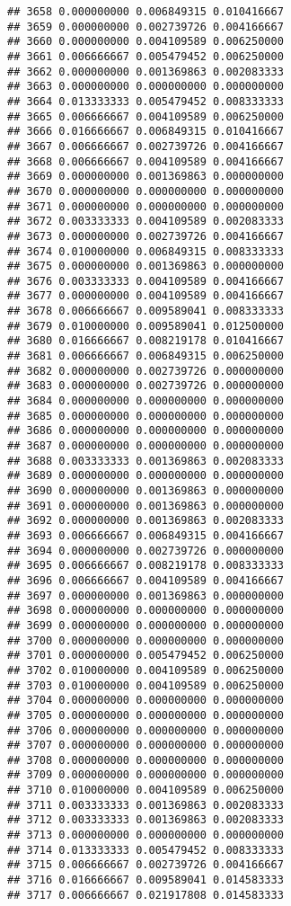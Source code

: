 \documentclass[
]{article}
\begin{document}
\begin{verbatim}
## 3658 0.000000000 0.006849315 0.010416667
## 3659 0.000000000 0.002739726 0.004166667
## 3660 0.000000000 0.004109589 0.006250000
## 3661 0.006666667 0.005479452 0.006250000
## 3662 0.000000000 0.001369863 0.002083333
## 3663 0.000000000 0.000000000 0.000000000
## 3664 0.013333333 0.005479452 0.008333333
## 3665 0.006666667 0.004109589 0.006250000
## 3666 0.016666667 0.006849315 0.010416667
## 3667 0.006666667 0.002739726 0.004166667
## 3668 0.006666667 0.004109589 0.004166667
## 3669 0.000000000 0.001369863 0.000000000
## 3670 0.000000000 0.000000000 0.000000000
## 3671 0.000000000 0.000000000 0.000000000
## 3672 0.003333333 0.004109589 0.002083333
## 3673 0.000000000 0.002739726 0.004166667
## 3674 0.010000000 0.006849315 0.008333333
## 3675 0.000000000 0.001369863 0.000000000
## 3676 0.003333333 0.004109589 0.004166667
## 3677 0.000000000 0.004109589 0.004166667
## 3678 0.006666667 0.009589041 0.008333333
## 3679 0.010000000 0.009589041 0.012500000
## 3680 0.016666667 0.008219178 0.010416667
## 3681 0.006666667 0.006849315 0.006250000
## 3682 0.000000000 0.002739726 0.000000000
## 3683 0.000000000 0.002739726 0.000000000
## 3684 0.000000000 0.000000000 0.000000000
## 3685 0.000000000 0.000000000 0.000000000
## 3686 0.000000000 0.000000000 0.000000000
## 3687 0.000000000 0.000000000 0.000000000
## 3688 0.003333333 0.001369863 0.002083333
## 3689 0.000000000 0.000000000 0.000000000
## 3690 0.000000000 0.001369863 0.000000000
## 3691 0.000000000 0.001369863 0.000000000
## 3692 0.000000000 0.001369863 0.002083333
## 3693 0.006666667 0.006849315 0.004166667
## 3694 0.000000000 0.002739726 0.000000000
## 3695 0.006666667 0.008219178 0.008333333
## 3696 0.006666667 0.004109589 0.004166667
## 3697 0.000000000 0.001369863 0.000000000
## 3698 0.000000000 0.000000000 0.000000000
## 3699 0.000000000 0.000000000 0.000000000
## 3700 0.000000000 0.000000000 0.000000000
## 3701 0.000000000 0.005479452 0.006250000
## 3702 0.010000000 0.004109589 0.006250000
## 3703 0.010000000 0.004109589 0.006250000
## 3704 0.000000000 0.000000000 0.000000000
## 3705 0.000000000 0.000000000 0.000000000
## 3706 0.000000000 0.000000000 0.000000000
## 3707 0.000000000 0.000000000 0.000000000
## 3708 0.000000000 0.000000000 0.000000000
## 3709 0.000000000 0.000000000 0.000000000
## 3710 0.010000000 0.004109589 0.006250000
## 3711 0.003333333 0.001369863 0.002083333
## 3712 0.003333333 0.001369863 0.002083333
## 3713 0.000000000 0.000000000 0.000000000
## 3714 0.013333333 0.005479452 0.008333333
## 3715 0.006666667 0.002739726 0.004166667
## 3716 0.016666667 0.009589041 0.014583333
## 3717 0.006666667 0.021917808 0.014583333

\end{verbatim}
\end{document}
